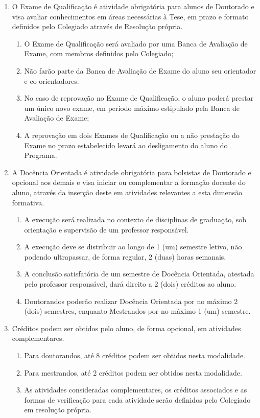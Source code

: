 \documentclass{article}
\newcommand{\grupoMenor}{Colegiado\xspace}
\begin{document}
\begin{enumerate}
	\item  O Exame de Qualificação é atividade obrigatória para alunos de Doutorado e visa avaliar conhecimentos em áreas necessárias à Tese, em prazo e formato definidos pelo \grupoMenor através de Resolução própria.
	\begin{enumerate}
		\item O Exame de Qualificação será avaliado por uma Banca de Avaliação de Exame, com membros definidos pelo \grupoMenor;
		\item Não farão parte da Banca de Avaliação de Exame do aluno seu orientador e co-orientadores.
		\item No caso de reprovação no Exame de Qualificação, o aluno poderá prestar um único novo exame, em período máximo estipulado pela Banca de Avaliação de Exame;
		\item A reprovação em dois Exames de Qualificação ou a não prestação do Exame no prazo estabelecido levará ao desligamento do aluno do Programa.
	\end{enumerate}

	\item A Docência Orientada é atividade obrigatória para bolsistas de Doutorado e opcional aos demais e visa iniciar ou complementar a formação docente do aluno, através da inserção deste em atividades relevantes a esta dimensão formativa.
	\begin{enumerate}
		\item A execução será realizada no contexto de disciplinas de graduação, sob orientação e supervisão de um professor responsável.
		\item A execução deve se distribuir ao longo de 1 (um) semestre letivo, não podendo ultrapassar, de forma regular, 2 (duas) horas semanais.
		\item A conclusão satisfatória de um semestre de Docência Orientada, atestada pelo professor responsável, dará direito a 2 (dois) créditos ao aluno.
		\item Doutorandos poderão realizar Docência Orientada por no máximo 2 (dois) semestres, enquanto Mestrandos por no máximo 1 (um) semestre.
	\end{enumerate}

	\item Créditos podem ser obtidos pelo aluno, de forma opcional, em atividades complementares.
	\begin{enumerate}
		\item Para doutorandos, até 8 créditos podem ser obtidos nesta modalidade.
		\item Para mestrandos, até 2 créditos podem ser obtidos nesta modalidade.
		\item As atividades consideradas complementares, os créditos associados e as formas de verificação para cada atividade serão definidos pelo \grupoMenor em resolução própria.
	\end{enumerate}

\end{enumerate}
\end{document}
